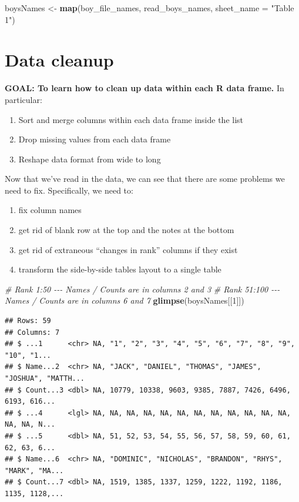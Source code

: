 \documentclass[
]{book}
\newenvironment{Shaded}{\begin{snugshade}}{\end{snugshade}}
\newcommand{\CommentTok}[1]{\textcolor[rgb]{0.56,0.35,0.01}{\textit{#1}}}
\newcommand{\DataTypeTok}[1]{\textcolor[rgb]{0.13,0.29,0.53}{#1}}
\newcommand{\DecValTok}[1]{\textcolor[rgb]{0.00,0.00,0.81}{#1}}
\newcommand{\KeywordTok}[1]{\textcolor[rgb]{0.13,0.29,0.53}{\textbf{#1}}}
\newcommand{\NormalTok}[1]{#1}
\newcommand{\StringTok}[1]{\textcolor[rgb]{0.31,0.60,0.02}{#1}}
\providecommand{\tightlist}{%
  \setlength{\itemsep}{0pt}\setlength{\parskip}{0pt}}
\begin{document}
\begin{Shaded}
\begin{Highlighting}[]
\NormalTok{boysNames \textless{}{-}}\StringTok{ }\KeywordTok{map}\NormalTok{(boy\_file\_names, read\_boys\_names, }\DataTypeTok{sheet\_name =} \StringTok{"Table 1"}\NormalTok{)}
\end{Highlighting}
\end{Shaded}

\hypertarget{data-cleanup}{%
\section{Data cleanup}\label{data-cleanup}}

\textbf{GOAL: To learn how to clean up data within each R data frame.} In particular:

\begin{enumerate}
\def\labelenumi{\arabic{enumi}.}
\tightlist
\item
  Sort and merge columns within each data frame inside the list
\item
  Drop missing values from each data frame
\item
  Reshape data format from wide to long
\end{enumerate}

Now that we've read in the data, we can see that there are some problems we need to fix. Specifically, we need to:

\begin{enumerate}
\def\labelenumi{\arabic{enumi}.}
\tightlist
\item
  fix column names
\item
  get rid of blank row at the top and the notes at the bottom
\item
  get rid of extraneous ``changes in rank'' columns if they exist
\item
  transform the side-by-side tables layout to a single table
\end{enumerate}

\begin{Shaded}
\begin{Highlighting}[]
\CommentTok{\# Rank 1:50 {-}{-}{-} Names / Counts are in columns 2 and 3 }
\CommentTok{\# Rank 51:100 {-}{-}{-} Names / Counts are in columns 6 and 7}
\KeywordTok{glimpse}\NormalTok{(boysNames[[}\DecValTok{1}\NormalTok{]]) }
\end{Highlighting}
\end{Shaded}

\begin{verbatim}
## Rows: 59
## Columns: 7
## $ ...1      <chr> NA, "1", "2", "3", "4", "5", "6", "7", "8", "9", "10", "1...
## $ Name...2  <chr> NA, "JACK", "DANIEL", "THOMAS", "JAMES", "JOSHUA", "MATTH...
## $ Count...3 <dbl> NA, 10779, 10338, 9603, 9385, 7887, 7426, 6496, 6193, 616...
## $ ...4      <lgl> NA, NA, NA, NA, NA, NA, NA, NA, NA, NA, NA, NA, NA, NA, N...
## $ ...5      <dbl> NA, 51, 52, 53, 54, 55, 56, 57, 58, 59, 60, 61, 62, 63, 6...
## $ Name...6  <chr> NA, "DOMINIC", "NICHOLAS", "BRANDON", "RHYS", "MARK", "MA...
## $ Count...7 <dbl> NA, 1519, 1385, 1337, 1259, 1222, 1192, 1186, 1135, 1128,...
\end{verbatim}
\end{document}
